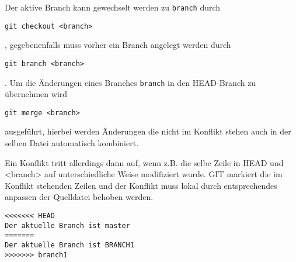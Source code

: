 \documentclass{scrartcl}
\begin{document}
Der aktive Branch kann gewechselt werden zu \texttt{branch} durch
\begin{lstlisting}
git checkout <branch>
\end{lstlisting}
, gegebenenfalls muss vorher ein Branch angelegt werden durch
\begin{lstlisting}
git branch <branch>
\end{lstlisting}
. Um die Änderungen eines Branches \texttt{branch} in den HEAD-Branch zu übernehmen wird 
\begin{lstlisting}
git merge <branch>
\end{lstlisting}
ausgeführt, hierbei werden Änderungen die nicht im Konflikt stehen auch in der selben Datei automatisch kombiniert. 

Ein Konflikt tritt allerdings dann auf, wenn z.B. die selbe Zeile in HEAD und <branch> auf unterschiedliche Weise modifiziert wurde. GIT markiert die im Konflikt stehenden Zeilen und der Konflikt muss lokal durch entsprechendes anpassen der Quelldatei behoben werden.
\begin{lstlisting}
<<<<<<< HEAD
Der aktuelle Branch ist master
=======
Der aktuelle Branch ist BRANCH1
>>>>>>> branch1
\end{lstlisting}
\end{document}
